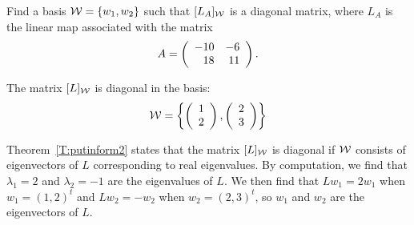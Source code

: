 \documentclass{ximera}
\begin{document}
\begin{exercise} \label{c7.3.4}
Find a basis ${\cal W}=\{w_1,w_2\}$ such that $[L_A]_{\cal W}$ is
a diagonal matrix, where $L_A$ is the linear map associated with the
matrix
\[
A = \left(\begin{array}{rr} -10 & -6\\ 18 &11\end{array}\right).
\]

\begin{solution}

\ans The matrix $[L]_{\cal W}$ is diagonal in the basis:
\[
{\cal W} = \left\{\left(\begin{array}{r} 1 \\ 2\end{array}\right),\left(\begin{array}{r} 2 \\ 3\end{array}\right)\right\}
\]

\soln Theorem~\ref{T:putinform2} states
that the matrix $[L]_{\cal W}$ is diagonal if ${\cal W}$ consists of
eigenvectors of $L$ corresponding to real eigenvalues.  By
computation, we find that $\lambda_1 = 2$ and $\lambda_2 = -1$ are
the eigenvalues of $L$.  We then find that $Lw_1 = 2w_1$ when
$w_1 = (1,2)^t$ and $Lw_2 = -w_2$ when $w_2 = (2,3)^t$, so $w_1$ and
$w_2$ are the eigenvectors of $L$.

\end{solution}
\end{exercise}
\end{document}
